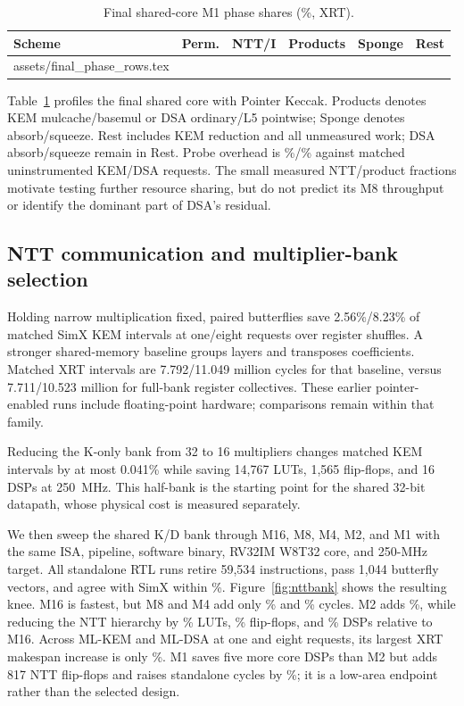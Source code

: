 \documentclass[conference,letterpaper]{IEEEtran}
\makeatletter
\newcommand{\tablerows}[1]{\@@input #1 }
\makeatother
\begin{document}
\begin{table}[t]
\caption{Final shared-core M1 phase shares (\%, XRT).}
\label{tab:finalphases}
\centering\small
\setlength{\tabcolsep}{3pt}
\begin{tabular}{@{}lrrrrr@{}}
\toprule
Scheme & Perm. & NTT/I & Products & Sponge & Rest \\
\midrule
\tablerows{assets/final_phase_rows.tex}
\bottomrule
\end{tabular}
\end{table}

Table~\ref{tab:finalphases} profiles the final shared core with Pointer
Keccak. Products denotes KEM mulcache/basemul or DSA ordinary/L5 pointwise;
Sponge denotes absorb/squeeze. Rest includes KEM reduction and all
unmeasured work; DSA absorb/squeeze remain in Rest. Probe overhead is
\KemFinalProbePct{}\%/\DsaFinalProbePct{}\% against matched uninstrumented
KEM/DSA requests. The small measured NTT/product fractions motivate testing
further resource sharing, but do not predict its M8 throughput or identify
the dominant part of DSA's residual.

\subsection{NTT communication and multiplier-bank selection}
Holding narrow multiplication fixed, paired butterflies save 2.56\%/8.23\%
of matched SimX KEM intervals at one/eight requests over register shuffles.
A stronger shared-memory baseline groups layers and transposes coefficients.
Matched XRT intervals are 7.792/11.049 million cycles for that baseline,
versus 7.711/10.523 million for full-bank register collectives. These
earlier pointer-enabled runs include floating-point hardware; comparisons
remain within that family.

Reducing the K-only bank from 32 to 16 multipliers changes matched KEM
intervals by at most 0.041\% while saving 14,767 LUTs, 1,565 flip-flops,
and 16 DSPs at 250~MHz. This half-bank is the starting point for the shared
32-bit datapath, whose physical cost is measured separately.

We then sweep the shared K/D bank through M16, M8, M4, M2, and M1 with the
same ISA, pipeline, software binary, RV32IM W8T32 core, and 250-MHz target.
All standalone RTL runs retire 59,534 instructions, pass 1,044 butterfly
vectors, and agree with SimX within \BankParityMax{}\%. Figure~\ref{fig:nttbank}
shows the resulting knee. M16 is fastest, but M8 and M4 add only
\BankEightNttPenalty{}\% and \BankFourNttPenalty{}\% cycles. M2 adds
\BankTwoNttPenalty{}\%, while reducing the NTT hierarchy by
\BankTwoNttLutSaved{}\% LUTs, \BankTwoNttFfSaved{}\% flip-flops, and
\BankTwoNttDspSaved{}\% DSPs relative to M16. Across ML-KEM and ML-DSA at
one and eight requests, its largest XRT makespan increase is only
\BankTwoEndToEndMax{}\%. M1 saves five more core DSPs than M2 but adds 817 NTT
flip-flops and raises standalone cycles by \BankOneNttPenalty{}\%; it is a
low-area endpoint rather than the selected design.
\end{document}
